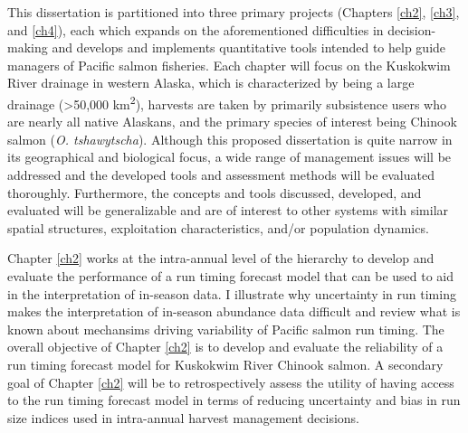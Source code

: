 \documentclass[12pt,]{book}
\theoremstyle{definition}
\theoremstyle{definition}
\theoremstyle{definition}
\theoremstyle{remark}
\begin{document}
This dissertation is partitioned into three primary projects (Chapters
\ref{ch2}, \ref{ch3}, and \ref{ch4}), each which expands on the
aforementioned difficulties in decision-making and develops and
implements quantitative tools intended to help guide managers of Pacific
salmon fisheries. Each chapter will focus on the Kuskokwim River
drainage in western Alaska, which is characterized by being a large
drainage (\textgreater{}50,000 km\textsuperscript{2}), harvests are
taken by primarily subsistence users who are nearly all native Alaskans,
and the primary species of interest being Chinook salmon (\emph{O.
tshawytscha}). Although this proposed dissertation is quite narrow in
its geographical and biological focus, a wide range of management issues
will be addressed and the developed tools and assessment methods will be
evaluated thoroughly. Furthermore, the concepts and tools discussed,
developed, and evaluated will be generalizable and are of interest to
other systems with similar spatial structures, exploitation
characteristics, and/or population dynamics.

Chapter \ref{ch2} works at the intra-annual level of the hierarchy to
develop and evaluate the performance of a run timing forecast model that
can be used to aid in the interpretation of in-season data. I illustrate
why uncertainty in run timing makes the interpretation of in-season
abundance data difficult and review what is known about mechansims
driving variability of Pacific salmon run timing. The overall objective
of Chapter \ref{ch2} is to develop and evaluate the reliability of a run
timing forecast model for Kuskokwim River Chinook salmon. A secondary
goal of Chapter \ref{ch2} will be to retrospectively assess the utility
of having access to the run timing forecast model in terms of reducing
uncertainty and bias in run size indices used in intra-annual harvest
management decisions.
\end{document}
